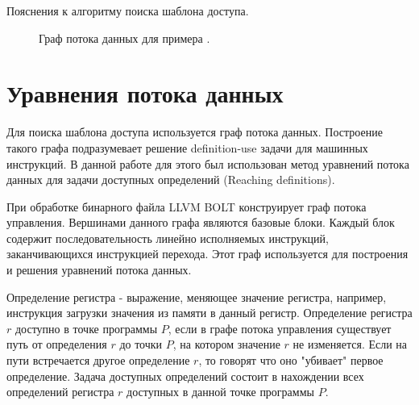 \documentclass{mipt-thesis-bs}
\begin{document}
    \begin{listing}[h!]
        \inputminted{gas}{src/template_algo.s}
        \caption{Пояснения к алгоритму поиска шаблона доступа.}
        \label{fig:template_search_algo}
    \end{listing}

    \begin{figure}[h!]
        \centering
        \caption{Граф потока данных для примера .}
    \end{figure}

    \section{Уравнения потока данных}
    Для поиска шаблона доступа используется граф потока данных. Построение такого графа подразумевает решение definition-use задачи для машинных инструкций. В данной работе для этого был использован метод уравнений потока данных для задачи доступных определений (Reaching definitions).

    При обработке бинарного файла LLVM BOLT конструирует граф потока управления. Вершинами данного графа являются базовые блоки. Каждый блок содержит последовательность линейно исполняемых инструкций, заканчивающихся инструкцией перехода. Этот граф используется для построения и решения уравнений потока данных.

    Определение регистра - выражение, меняющее значение регистра, например, инструкция загрузки значения из памяти в данный регистр. Определение регистра $r$ доступно в точке программы $P$, если в графе потока управления существует путь от определения $r$ до точки $P$, на котором значение $r$ не изменяется. Если на пути встречается другое определение $r$, то говорят что оно "убивает" первое определение. Задача доступных определений состоит в нахождении всех определений регистра $r$ доступных в данной точке программы $P$.
\end{document}
